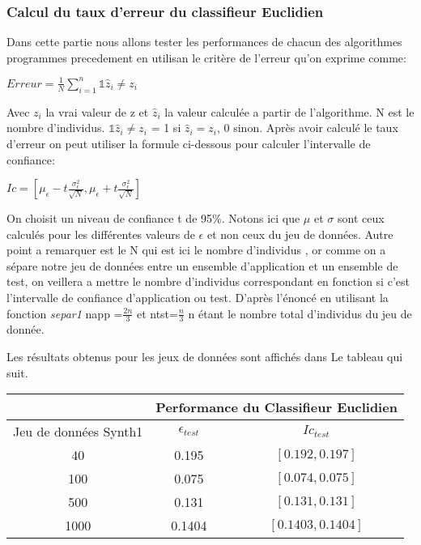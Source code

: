 \documentclass[10pt]{article}
\begin{document}
			\subsubsection{Calcul du taux d'erreur du classifieur Euclidien }
			Dans cette partie nous allons tester les performances de chacun des algorithmes programmes precedement en utilisan le critère de l'erreur qu'on exprime comme:
			\begin{center}
			$Erreur = \frac{1}{N} \sum_{i=1}^{n} {\mathds{1} \hat{z}_{i}  \neq z_{i}}$
			\end{center}
		Avec $z_{i}$ la vrai valeur de z et $\hat{z}_{i}$ la valeur calculée a partir de l'algorithme. N est le nombre d'individus. $\mathds{1} \hat{z}_{i}  \neq z_{i}$ = 1 si $\hat{z}_{i}  = z_{i}$, 0 sinon.
		Après avoir calculé le taux d'erreur on peut utiliser la formule ci-dessous pour calculer l'intervalle de confiance:
		\begin{center}
		$Ic = [\mu_\epsilon - t \frac{\sigma_{\epsilon}^2}{\sqrt{N}}, \mu_\epsilon + t \frac{\sigma_{\epsilon}^2}{\sqrt{N}}]$
		\end{center}
	
		On choisit un niveau de confiance t de 95\%. Notons ici que  $\mu$ et $\sigma$ sont ceux calculés pour les différentes valeurs de $\epsilon$ et non ceux du jeu de données. Autre point a remarquer est le N qui est ici le nombre d'individus , or comme on a sépare notre jeu de données entre un ensemble d'application et un ensemble de test, on veillera a mettre le nombre d'individus correspondant en fonction si c'est l'intervalle de confiance  d'application ou test. D'après l'énoncé en utilisant la fonction \textit{separ1} napp =$\frac{2n}{3}$  et ntst=$\frac{n}{3}$ n étant le nombre total d'individus du jeu de donnée.
			
			Les résultats obtenus pour les jeux de données sont affichés dans Le tableau qui suit.
			\begin{center}		
				\begin{tabular}{ | c | c | c |}
						\rowcolor{lightgray} 
				   	&  \multicolumn{2}{|c|}{ Performance du  Classifieur Euclidien}\\
					
					\hline
					Jeu de données Synth1 &  $\epsilon_{test}$ &  $Ic_{test}$  \\
					\hline
					\multirow{1}{*}{40}       &     0.195     & 	$[0.192, 0.197 ]$ \\
																
					\hline
					\multirow{1}{*}{100}      &       0.075   & 	$[0.074, 0.075]$  \\
				
					\hline
					\multirow{1}{*}{500}        &      0.131   & 	$[0.131, 0.131]$	\\
				
					\hline
					\multirow{1}{*}{1000}      &      0.1404  & $[0.1403, 0.1404]$  	\\
				
					\hline
				\end{tabular}
			\end{center}
		
\end{document}
